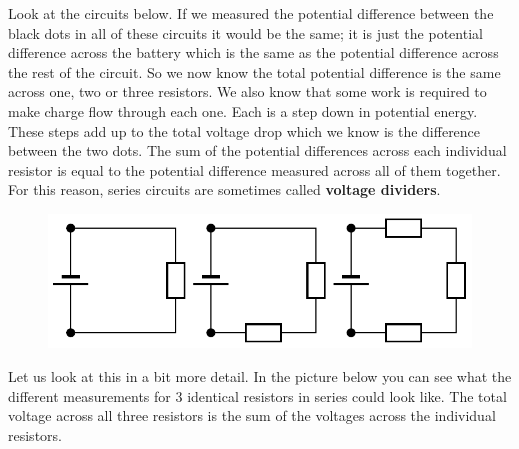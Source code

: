         \label{m38776*id64076}Look at the circuits below. If we measured the potential difference between the black dots in all of these circuits it would be the same; it is just the potential difference across the battery which is the same as the potential difference across the rest of the circuit. So we now know the total potential difference is the same across one, two or three resistors. We also know that some work is required to make charge flow through each one. Each is a step down in potential energy. These steps add up to the total voltage drop which we know is the difference between the two dots.
The sum of the potential differences across each individual resistor is equal to the potential difference measured across all of them together. For this reason, series circuits are sometimes called \textbf{voltage dividers}.\par 
        \label{m38776*id64084}
    \setcounter{subfigure}{0}
	\begin{figure}[H] %
    \begin{center}
    \label{m38776*id64087!!!underscore!!!media}\label{m38776*id64087!!!underscore!!!printimage}\includegraphics[width=\columnwidth]{col11305.imgs/m38776_PG10C9_018.png} %
      \vspace{2pt}
    \vspace{.1in}
    \end{center}
 \end{figure}       
        \par 
        \label{m38776*id64094}Let us look at this in a bit more detail. In the picture below you can see what the different measurements for 3 identical resistors in series could look like. The total voltage across all three resistors is the sum of the voltages across the individual resistors. \par 
        \label{m38776*id64099}
    \setcounter{subfigure}{0}
